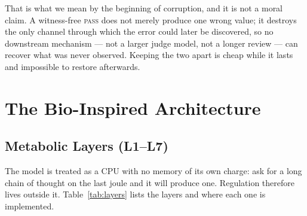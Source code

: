 \documentclass[conference]{IEEEtran}
\begin{document}
That is what we mean by the beginning of corruption, and it is not a moral
claim. A witness-free \textsc{pass} does not merely produce one wrong value; it
destroys the only channel through which the error could later be discovered, so
no downstream mechanism --- not a larger judge model, not a longer review --- can
recover what was never observed. Keeping the two apart is cheap while it lasts and
impossible to restore afterwards.

\section{The Bio-Inspired Architecture}
\label{sec:arch}

\subsection{Metabolic Layers (L1--L7)}
\label{sec:layers}

The model is treated as a CPU with no memory of its own charge: ask for a long
chain of thought on the last joule and it will produce one. Regulation therefore
lives outside it. Table~\ref{tab:layers} lists the layers and where each one is
implemented.
\end{document}
